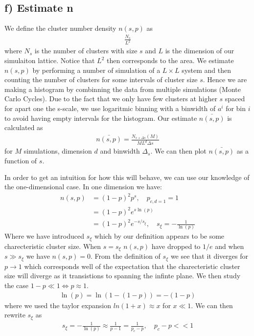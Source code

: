 \documentclass[reprint, amsmath, amssymb, aps]{revtex4-2}
\begin{document}
\subsection*{f) Estimate n}
We define the cluster number density $n(s,p)$ as
\begin{align*}
  \frac{N_s}{L^2}
\end{align*}
where $N_s$ is the number of clusters with size $s$ and $L$ is the dimension of our simulaiton lattice. Notice that $L^2$ then corresponds to the area. We estimate $n(s,p)$ by performing a number of simulation of a $L\times L$ system and then counting the number of clusters for some intervals of cluster size $s$. Hence we are making a histogram by combinning the data from multiple simulations (Monte Carlo Cycles). Due to the fact that we only have few clusters at higher $s$ spaced for apart one the s-scale, we use logaritmic binning with a binwidth of $a^i$ for bin $i$ to avoid having empty intervals for the histogram. Our estimate $\bar{n(s,p)}$ is calculated as
\begin{align*}
  \bar{n(s,p)} = \frac{N_{s + \Delta s}(M)}{ML^d \Delta s}
\end{align*}
for $M$ simulations, dimension $d$ and binwidth $\Delta_s$. We can then plot $\bar{n(s,p)}$ as a function of $s$. \par
In order to get an intuition for how this will behave, we can use our knowledge of the one-dimensional case. In one dimension we have:
\begin{align*}
  n(s,p) &= (1-p)^2p^s, \quad p_{c,d=1} = 1 \\
  &= (1-p)^2e^{s\ln{(p)}} \\
  &= (1-p)^2 e^{-s/s_\xi}, \quad s_\xi=-\frac{1}{\ln{(p)}}
\end{align*}
Where we have introduced $s_{\xi}$ which by our definition appears to be some charecteristic cluster size. When $s = s_\xi$ $n(s,p)$ have dropped to $1/e$ and when $s \gg s_\xi$ we have $n(s,p)=0$. From the definition of $s_\xi$ we see that it diverges for $p \to 1$ which corresponds well of the expectation that the charecteristic cluster size will diverge as it transistions to spanning the infinte plane. We then study the case $1-p \ll 1 \Longleftrightarrow p \approx 1$.
\begin{align*}
  \ln{(p)} = \ln{(1 - (1-p))} = - (1-p)
\end{align*}
where we used the taylor expansion $ln{(1+x)} \approx x$ for $x \ll 1$. We can then rewrite $s_\xi$ as
\begin{align*}
  s_\xi = -\frac{1}{\ln{(p)}} \approx \frac{1}{p-1} = \frac{1}{p_c -p}, \quad p_c-p << 1
\end{align*}
\end{document}
